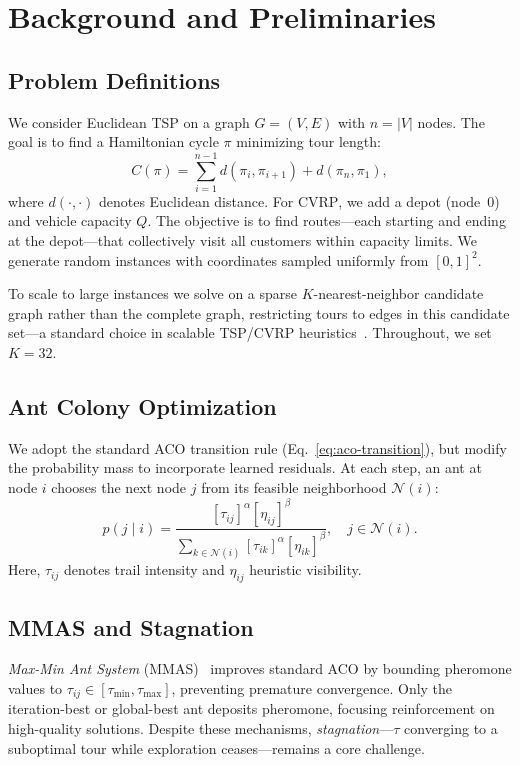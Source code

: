\documentclass[sigconf,anonymous,review]{acmart}
\theoremstyle{definition}
\theoremstyle{plain}
\newcommand{\TSP}{\textsc{TSP}}
\newcommand{\CVRP}{\textsc{CVRP}}
\newcommand{\MMAS}{\textsc{MMAS}}
\begin{document}
\section{Background and Preliminaries}
\label{sec:background}

\subsection{Problem Definitions}
We consider Euclidean \TSP{} on a graph $G=(V, E)$ with $n = |V|$ nodes.
The goal is to find a Hamiltonian cycle $\pi$ minimizing tour length:
\begin{equation}
C(\pi) = \sum_{i=1}^{n-1} d(\pi_i, \pi_{i+1}) + d(\pi_n, \pi_1),
\end{equation}
where $d(\cdot, \cdot)$ denotes Euclidean distance.
For \CVRP{}, we add a depot (node~0) and vehicle capacity $Q$.
The objective is to find routes---each starting and ending at the depot---that collectively visit all customers within capacity limits.
We generate random instances with coordinates sampled uniformly from $[0, 1]^2$.

To scale to large instances we solve on a sparse $K$-nearest-neighbor candidate graph rather than the complete graph, restricting tours to edges in this candidate set---a standard choice in scalable \TSP{}/\CVRP{} heuristics~\cite{helsgaun2000effective}.
Throughout, we set $K=32$.

\subsection{Ant Colony Optimization}
\label{sec:aco}
We adopt the standard ACO transition rule (Eq.~\ref{eq:aco-transition}), but modify the probability mass to incorporate learned residuals.
At each step, an ant at node $i$ chooses the next node $j$ from its feasible neighborhood $\mathcal{N}(i)$:
\begin{equation}
p(j \mid i) = \frac{[\tau_{ij}]^\alpha [\eta_{ij}]^\beta}{\sum_{k \in \mathcal{N}(i)} [\tau_{ik}]^\alpha [\eta_{ik}]^\beta}, \quad j \in \mathcal{N}(i).
\label{eq:aco-transition}
\end{equation}
Here, $\tau_{ij}$ denotes trail intensity and $\eta_{ij}$ heuristic visibility.

\subsection{\MMAS{} and Stagnation}
\emph{Max-Min Ant System} (\MMAS{})~\cite{stutzle2000max} improves standard ACO by bounding pheromone values to $\tau_{ij} \in [\tau_{\min}, \tau_{\max}]$, preventing premature convergence.
Only the iteration-best or global-best ant deposits pheromone, focusing reinforcement on high-quality solutions.
Despite these mechanisms, \emph{stagnation}---$\tau$ converging to a suboptimal tour while exploration ceases---remains a core challenge.
\end{document}
